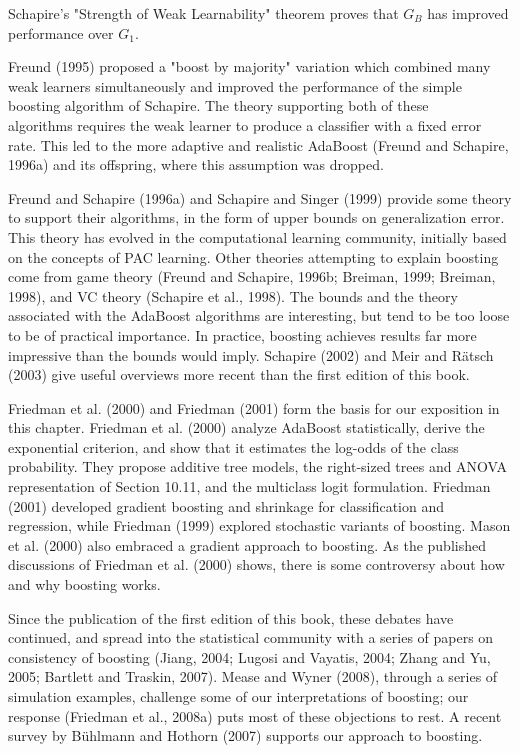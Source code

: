 \documentclass[10pt]{article}
\begin{document}
Schapire's "Strength of Weak Learnability" theorem proves that $G_{B}$ has improved performance over $G_{1}$.

Freund (1995) proposed a "boost by majority" variation which combined many weak learners simultaneously and improved the performance of the simple boosting algorithm of Schapire. The theory supporting both of these\\
algorithms requires the weak learner to produce a classifier with a fixed error rate. This led to the more adaptive and realistic AdaBoost (Freund and Schapire, 1996a) and its offspring, where this assumption was dropped.

Freund and Schapire (1996a) and Schapire and Singer (1999) provide some theory to support their algorithms, in the form of upper bounds on generalization error. This theory has evolved in the computational learning community, initially based on the concepts of PAC learning. Other theories attempting to explain boosting come from game theory (Freund and Schapire, 1996b; Breiman, 1999; Breiman, 1998), and VC theory (Schapire et al., 1998). The bounds and the theory associated with the AdaBoost algorithms are interesting, but tend to be too loose to be of practical importance. In practice, boosting achieves results far more impressive than the bounds would imply. Schapire (2002) and Meir and Rätsch (2003) give useful overviews more recent than the first edition of this book.

Friedman et al. (2000) and Friedman (2001) form the basis for our exposition in this chapter. Friedman et al. (2000) analyze AdaBoost statistically, derive the exponential criterion, and show that it estimates the log-odds of the class probability. They propose additive tree models, the right-sized trees and ANOVA representation of Section 10.11, and the multiclass logit formulation. Friedman (2001) developed gradient boosting and shrinkage for classification and regression, while Friedman (1999) explored stochastic variants of boosting. Mason et al. (2000) also embraced a gradient approach to boosting. As the published discussions of Friedman et al. (2000) shows, there is some controversy about how and why boosting works.

Since the publication of the first edition of this book, these debates have continued, and spread into the statistical community with a series of papers on consistency of boosting (Jiang, 2004; Lugosi and Vayatis, 2004; Zhang and Yu, 2005; Bartlett and Traskin, 2007). Mease and Wyner (2008), through a series of simulation examples, challenge some of our interpretations of boosting; our response (Friedman et al., 2008a) puts most of these objections to rest. A recent survey by Bühlmann and Hothorn (2007) supports our approach to boosting.
\end{document}
